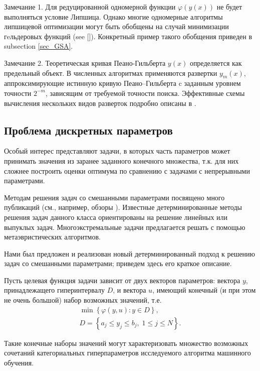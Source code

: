 \documentclass[preprint,12pt]{elsarticle}
\begin{document}
Замечание 1. Для редуцированной одномерной функции $\varphi(y(x))$  не будет выполняться условие Липшица. Однако многие одномерные алгоритмы липшицевой оптимизации
могут быть обобщены на случай минимизации гeльдеровых функций (see []). Конкретный пример такого обобщения приведен в subsection \ref{sec_GSA}. 

Замечание 2. Теоретическая кривая Пеано-Гильберта $y(x)$ определяется как предельный объект. В численных алгоритмах применяются развертки $y_m(x)$, аппроксимирующие истинную кривую Пеано–Гильберта c заданным уровнем точности $2^{-m}$, зависящим от требуемой точности поиска. Эффективные схемы вычисления нескольких видов разверток подробно описаны в \cite{Sergeyev2013}.


\subsection{Проблема дискретных параметров} 

Особый интерес представляют задачи, в которых часть параметров может принимать значения из заранее заданного конечного множества, т.к. для них сложнее построить оценки оптимума по сравнению с задачами с непрерывными параметрами.

Методам решения задач со смешанными параметрами посвящено много публикаций (см., например, обзоры \cite{Burer2012,Boukouvala2016}). 
Известные детерминированные методы решения задач данного класса ориентированы на решение линейных или выпуклых задач.
Многоэкстремальные задачи предлагается решать с помощью метаэвристических алгоритмов.

Нами был предложен и реализован новый детерминированный подход к решению задач со смешанными параметрами; приведем здесь его краткое описание. 

Пусть  целевая функция задачи зависит от двух векторов параметров: вектора $y$, принадлежащего гиперинтервалу $D$, и вектора $u$, имеющий конечный (и при этом не очень большой) набор возможных значений, т.е. 
\begin{gather}\label{problem_i}
\min{\left\{ \varphi(y,u) : y\in D \right\}},\\
D=\left\{a_j \leq y_j \leq b_j, \; 1\leq j \leq N \right\}.\nonumber
\end{gather}

Такие конечные наборы значений могут характеризовать множество возможных сочетаний категориальных гиперпараметров исследуемого алгоритма машинного обучения. 
\end{document}
